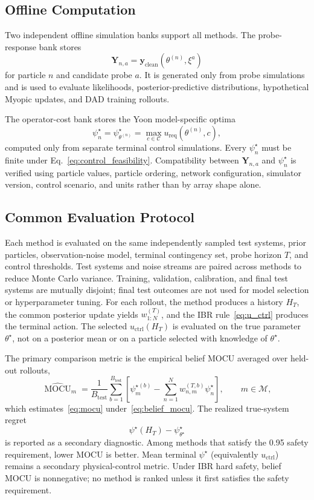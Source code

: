\documentclass[11pt]{article}
\begin{document}
\subsection{Offline Computation}

Two independent offline simulation banks support all methods. The probe-response bank stores
\[
\mathbf Y_{n,a}
=
\mathbf y_{\mathrm{clean}}(\theta^{(n)},\xi^a)
\]
for particle \(n\) and candidate probe \(a\). It is generated only from probe simulations and is used to evaluate likelihoods, posterior-predictive distributions, hypothetical Myopic updates, and DAD training rollouts.

The operator-cost bank stores the Yoon model-specific optima
\[
\psi_n^\star=\psi_{\theta^{(n)}}^\star=\max_{c\in\mathcal C}u_{\mathrm{req}}(\theta^{(n)},c),
\]
computed only from separate terminal control simulations. Every \(\psi_n^\star\) must be finite under Eq.~\eqref{eq:control_feasibility}. Compatibility between \(\mathbf Y_{n,a}\) and \(\psi_n^\star\) is verified using particle values, particle ordering, network configuration, simulator version, control scenario, and units rather than by array shape alone.

\subsection{Common Evaluation Protocol}

Each method is evaluated on the same independently sampled test systems,
prior particles, observation-noise model, terminal contingency set, probe
horizon \(T\), and control thresholds. Test systems and noise streams are
paired across methods to reduce Monte Carlo variance. Training, validation,
calibration, and final test systems are mutually disjoint; final test outcomes
are not used for model selection or hyperparameter tuning. For each rollout,
the method produces a history \(H_T\), the common posterior update yields
\(w_{1:N}^{(T)}\), and the IBR rule~\eqref{eq:u_ctrl} produces the terminal
action. The selected \(u_{\mathrm{ctrl}}(H_T)\) is evaluated on the true
parameter \(\theta^\star\), not on a posterior mean or on a particle selected
with knowledge of \(\theta^\star\).

The primary comparison metric is the empirical belief MOCU averaged over
held-out rollouts,
\[
\boxed{
\widehat{\operatorname{MOCU}}_m
=
\frac{1}{B_{\mathrm{test}}}
\sum_{b=1}^{B_{\mathrm{test}}}
\left[
\psi^{\star(b)}_m
-
\sum_{n=1}^{N}
w_{n,m}^{(T,b)}
\psi_n^\star
\right],
\qquad
m\in\mathcal M,
}
\]
which estimates~\eqref{eq:mocu} under~\eqref{eq:belief_mocu}. The realized
true-system regret
\[
\psi^\star(H_T)-\psi_{\theta^\star}^\star
\]
is reported as a secondary diagnostic. Among methods that satisfy the 0.95
safety requirement, lower MOCU is better. Mean terminal \(\psi^\star\)
(equivalently \(u_{\mathrm{ctrl}}\)) remains a secondary physical-control
metric. Under IBR hard safety, belief MOCU is nonnegative; no method is ranked
unless it first satisfies the safety requirement.
\end{document}
